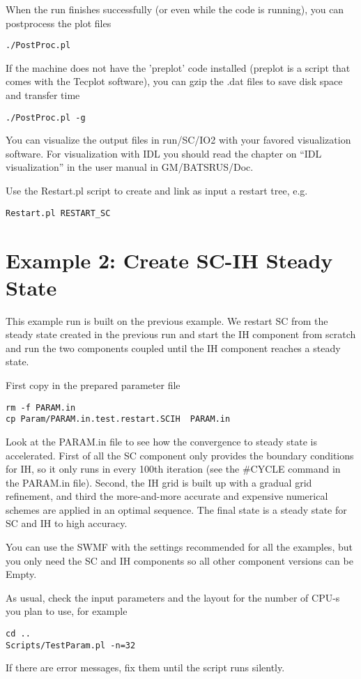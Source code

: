 When the run finishes successfully (or even while the code is running), 
you can postprocess the plot files
\begin{verbatim}
./PostProc.pl
\end{verbatim}
If the machine does not have the 'preplot' code
installed (preplot is a script that comes with the Tecplot software),
you can gzip the .dat files to save disk space and transfer time
\begin{verbatim}
./PostProc.pl -g
\end{verbatim}
You can visualize the output files in run/SC/IO2 with your favored 
visualization software. For visualization with IDL you should read the
chapter on ``IDL visualization'' in the user manual in GM/BATSRUS/Doc.

Use the Restart.pl script to create and link as input a restart tree, e.g.
\begin{verbatim}
Restart.pl RESTART_SC
\end{verbatim}

\section{Example 2: Create SC-IH Steady State}

This example run is built on the previous example. We restart SC from the
steady state created in the previous run and start the IH component from 
scratch and run the two components coupled until the IH component reaches
a steady state. 

First copy in the prepared parameter file
\begin{verbatim}
rm -f PARAM.in
cp Param/PARAM.in.test.restart.SCIH  PARAM.in
\end{verbatim}
Look at the PARAM.in file to see how the convergence to 
steady state is accelerated.
First of all the SC component only provides the boundary conditions for IH,
so it only runs in every 100th iteration (see the \#CYCLE command in
the PARAM.in file). Second, the IH grid is built
up with a gradual grid refinement, and third the 
more-and-more accurate and expensive numerical schemes are 
applied in an optimal sequence. The final state
is a steady state for SC and IH to high accuracy. 

You can use the SWMF with the settings recommended for all the examples,
but you only need the SC and IH components so 
all other component versions can be Empty.

As usual, check the input parameters and the layout for the
number of CPU-s you plan to use, for example
\begin{verbatim}
cd ..
Scripts/TestParam.pl -n=32
\end{verbatim}
If there are error messages, fix them until the script runs silently.

